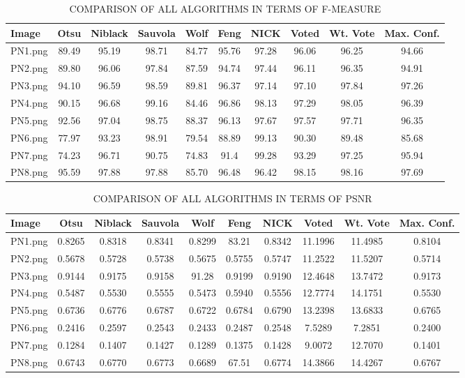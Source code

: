 \documentclass[conference]{IEEEtran}
\begin{document}
\begin{table}[!t]
\caption{COMPARISON OF ALL ALGORITHMS IN TERMS OF F-MEASURE}
\centering
\begin{tabular}{|l|c|c|c|c|c|c|c|c|c|}
\hline
Image & Otsu & Niblack & Sauvola & Wolf & Feng & NICK & Voted & Wt. Vote & Max. Conf. \\
\hline
PN1.png & 89.49 & 95.19 & 98.71 & 84.77 & 95.76 & 97.28 & 96.06 & 96.25 & 94.66 \\
PN2.png & 89.80 & 96.06 & 97.84 & 87.59 & 94.74 & 97.44 & 96.11 & 96.35 & 94.91 \\
PN3.png & 94.10 & 96.59 & 98.59 & 89.81 & 96.37 & 97.14 & 97.10 & 97.84 & 97.26 \\
PN4.png & 90.15 & 96.68 & 99.16 & 84.46 & 96.86 & 98.13 & 97.29 & 98.05 & 96.39 \\
PN5.png & 92.56 & 97.04 & 98.75 & 88.37 & 96.13 & 97.67 & 97.57 & 97.71 & 96.35 \\
PN6.png & 77.97 & 93.23 & 98.91 & 79.54 & 88.89 & 99.13 & 90.30 & 89.48 & 85.68 \\
PN7.png & 74.23 & 96.71 & 90.75 & 74.83 & 91.4 & 99.28 & 93.29 & 97.25 & 95.94 \\
PN8.png & 95.59 & 97.88 & 97.88 & 85.70 & 96.48 & 96.42 & 98.15 & 98.16 & 97.69 \\
\hline
\end{tabular}
\label{tab:fmeasure}
\end{table}

\begin{table}[!t]
\caption{COMPARISON OF ALL ALGORITHMS IN TERMS OF PSNR}
\centering
\begin{tabular}{|l|c|c|c|c|c|c|c|c|c|}
\hline
Image & Otsu & Niblack & Sauvola & Wolf & Feng & NICK & Voted & Wt. Vote & Max. Conf. \\
\hline
PN1.png & 0.8265 & 0.8318 & 0.8341 & 0.8299 & 83.21 & 0.8342 & 11.1996 & 11.4985 & 0.8104 \\
PN2.png & 0.5678 & 0.5728 & 0.5738 & 0.5675 & 0.5755 & 0.5747 & 11.2522 & 11.5207 & 0.5714 \\
PN3.png & 0.9144 & 0.9175 & 0.9158 & 91.28 & 0.9199 & 0.9190 & 12.4648 & 13.7472 & 0.9173 \\
PN4.png & 0.5487 & 0.5530 & 0.5555 & 0.5473 & 0.5940 & 0.5556 & 12.7774 & 14.1751 & 0.5530 \\
PN5.png & 0.6736 & 0.6776 & 0.6787 & 0.6722 & 0.6784 & 0.6790 & 13.2398 & 13.6833 & 0.6765 \\
PN6.png & 0.2416 & 0.2597 & 0.2543 & 0.2433 & 0.2487 & 0.2548 & 7.5289 & 7.2851 & 0.2400 \\
PN7.png & 0.1284 & 0.1407 & 0.1427 & 0.1289 & 0.1375 & 0.1428 & 9.0072 & 12.7070 & 0.1401 \\
PN8.png & 0.6743 & 0.6770 & 0.6773 & 0.6689 & 67.51 & 0.6774 & 14.3866 & 14.4267 & 0.6767 \\
\hline
\end{tabular}
\label{tab:psnr}
\end{table}
\end{document}
